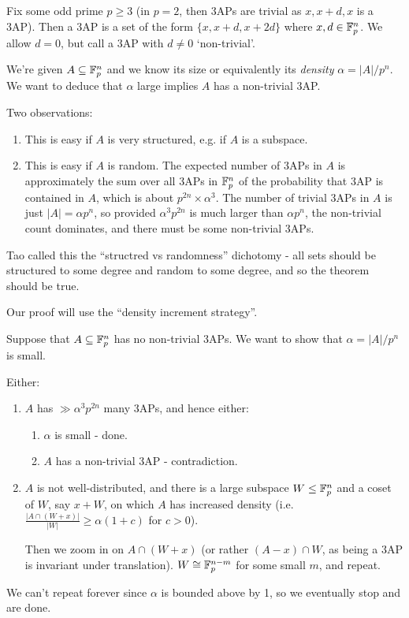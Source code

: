 \documentclass[10pt,a4paper]{article}
\begin{document}
Fix some odd prime $p\geq 3$ (in $p=2$, then 3APs are trivial as $x, x+d, x$ is a 3AP). Then a 3AP is  a set of the form $\{x, x+d, x+2d\}$ where $x, d \in \mathbb{F}_p^n$. We allow $d=0$, but call a 3AP with $d\neq 0$ `non-trivial'.

We're given $A \subseteq \mathbb{F}_p^n$ and we know its size or equivalently its \emph{density} $\alpha = |A|/p^n$. We want to deduce that $\alpha$ large implies $A$ has a non-trivial 3AP.

Two observations:
\begin{enumerate}
  \item This is easy if $A$ is very structured, e.g. if $A$ is a subspace.
  \item This is easy if $A$ is random. The expected number of 3APs in $A$ is approximately the sum over all 3APs in $\mathbb{F}_p^n$ of the probability that 3AP is contained in $A$, which is about $p^{2n} \times \alpha^3$. The number of trivial 3APs in $A$ is just $|A| = \alpha p^n$, so provided $\alpha^3 p^{2n}$ is much larger than $\alpha p^n$, the non-trivial count dominates, and there must be some non-trivial 3APs.
\end{enumerate}
Tao called this the ``structred vs randomness'' dichotomy - all sets should be structured to some degree and random to some degree, and so the theorem should be true.

Our proof will use the ``density increment strategy''.

Suppose that $A \subseteq \mathbb{F}_p^n$ has no non-trivial 3APs. We want to show that $\alpha = |A|/p^n$ is small.

Either:
\begin{enumerate}
  \item $A$ has $\gg \alpha^3 p^{2n}$ many 3APs, and hence either:
  \begin{enumerate}
    \item $\alpha$ is small - done.
    \item $A$ has a non-trivial 3AP - contradiction.
  \end{enumerate}
  \item $A$ is not well-distributed, and there is a large subspace $W \leq \mathbb{F}_p^n$ and a coset of $W$, say $x+W$, on which $A$ has increased density (i.e. $\frac{|A\cap (W+x)|}{|W|} \geq \alpha(1+c)$ for $c>0$).

  Then we zoom in on $A \cap (W+x)$ (or rather $(A-x)\cap W$, as being a 3AP is invariant under translation). $W \cong \mathbb{F}_p^{n-m}$ for some small $m$, and repeat.
\end{enumerate}
We can't repeat forever since $\alpha$ is bounded above by 1, so we eventually stop and are done.
\end{document}
